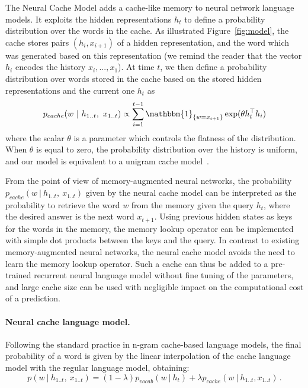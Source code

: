 \documentclass{article} \usepackage{iclr2017_conference,times}
\begin{document}
The Neural Cache Model adds a cache-like memory to neural network
language models.
It exploits the hidden representations $h_t$ to define a probability distribution over the words in the cache.
As illustrated Figure~\ref{fig:model}, the cache stores pairs $(h_i, x_{i+1})$ of a hidden
representation, and the word which was generated based on this representation
(we remind the reader that the vector $h_i$ encodes the history $x_i, ..., x_1$).
At time $t$, we then define a probability distribution over words stored in the cache based on the
stored hidden representations and the current one $h_t$ as
\begin{equation*}
p_{cache}( w \ | \ h_{1..t}, \ x_{1..t}) \propto \sum_{i=1}^{t-1} \mathbbm{1}_{\left\{ w = x_{i+1} \right\}} \exp (\theta h_t^{\top} h_i)
\end{equation*}
where the scalar $\theta$ is a parameter which controls the flatness of the distribution.
 When $\theta$ is equal to zero, the probability distribution over the history
 is uniform, and our model is equivalent to a unigram cache
 model~\citep{kuhn1990cache}.

From the point of view of memory-augmented neural networks, the
probability $p_{cache}( w \ | \ h_{1..t}, \ x_{1..t})$ given by the
neural cache model can be interpreted as the probability to retrieve
the word $w$ from the memory given the query $h_t$, where the desired
answer is the next word $x_{t+1}$. Using previous hidden states as
keys for the words in the memory, the memory lookup operator can be
implemented with simple dot products between the keys and the
query. In contrast to existing memory-augmented neural networks, the
neural cache model avoids the need to learn the memory lookup
operator. Such a cache can thus be added to a pre-trained recurrent
neural language model without fine tuning of the parameters, and large
cache size can be used with negligible impact on the computational
cost of a prediction.

\paragraph{Neural cache language model.}
Following the standard practice in n-gram cache-based language models,
the final probability of a word is given by  the linear interpolation of
the cache language model with the regular language model, obtaining:
\begin{equation*}
p(w \ | \ h_{1..t}, \ x_{1..t}) = (1 - \lambda) p_{vocab}(w \ | \ h_t) + \lambda p_{cache}(w \ | \ h_{1..t}, x_{1..t})\,.
\end{equation*}
\end{document}
